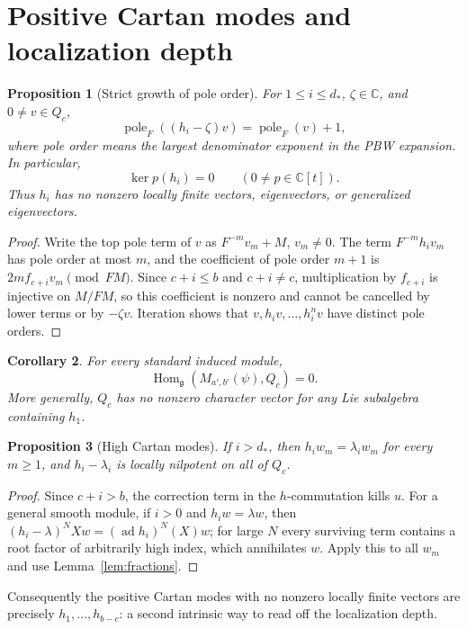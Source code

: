\documentclass[11pt,a4paper]{article}
\newcommand{\C}{\mathbb C}
\newcommand{\g}{\mathfrak g}
\newcommand{\ad}{\operatorname{ad}}
\newcommand{\Hom}{\operatorname{Hom}}
\newcommand{\pole}{\operatorname{pole}}
\theoremstyle{plainupright}
\newtheorem{proposition}{Proposition}[section]
\newtheorem{corollary}[proposition]{Corollary}
\begin{document}
\section{Positive Cartan modes and localization depth}\label{sec:cartan}

\begin{proposition}[Strict growth of pole order]\label{prop:pole}
For \(1\le i\le d_*\), \(\zeta\in\C\), and \(0\ne v\in Q_c\),
\[
\pole_F((h_i-\zeta)v)=\pole_F(v)+1,
\]
where pole order means the largest denominator exponent in the PBW expansion.
In particular,
\[
\ker p(h_i)=0\qquad(0\ne p\in\C[t]).
\]
Thus \(h_i\) has no nonzero locally finite vectors, eigenvectors, or
generalized eigenvectors.
\end{proposition}

\begin{proof}
Write the top pole term of \(v\) as \(F^{-m}v_m+M\), \(v_m\ne0\).
The term \(F^{-m}h_iv_m\) has pole order at most \(m\), and the coefficient of
pole order \(m+1\) is \(2mf_{c+i}v_m\pmod{FM}\). Since \(c+i\le b\) and
\(c+i\ne c\), multiplication by \(f_{c+i}\) is injective on \(M/FM\), so this
coefficient is nonzero and cannot be cancelled by lower terms or by
\(-\zeta v\). Iteration shows that \(v,h_iv,\ldots,h_i^nv\) have distinct pole
orders.
\end{proof}

\begin{corollary}\label{cor:no-whittaker}
For every standard induced module,
\[
\Hom_\g(M_{a',b'}(\psi),Q_c)=0.
\]
More generally, \(Q_c\) has no nonzero character vector for any Lie
subalgebra containing \(h_1\).
\end{corollary}

\begin{proposition}[High Cartan modes]\label{prop:high}
If \(i>d_*\), then \(h_iw_m=\lambda_iw_m\) for every \(m\ge1\), and
\(h_i-\lambda_i\) is locally nilpotent on all of \(Q_c\).
\end{proposition}

\begin{proof}
Since \(c+i>b\), the correction term in the \(h\)-commutation kills \(u\).
For a general smooth module, if \(i>0\) and \(h_iw=\lambda w\), then
\((h_i-\lambda)^NXw=(\ad h_i)^N(X)w\); for large \(N\) every surviving term
contains a root factor of arbitrarily high index, which annihilates \(w\).
Apply this to all \(w_m\) and use Lemma~\ref{lem:fractions}.
\end{proof}

Consequently the positive Cartan modes with no nonzero locally finite vectors
are precisely \(h_1,\ldots,h_{b-c}\): a second intrinsic way to read off the
localization depth.
\end{document}
